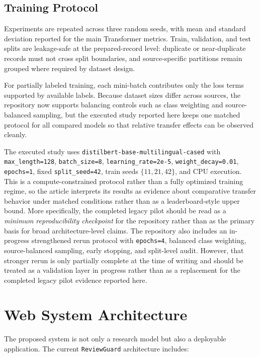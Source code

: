 \documentclass[12pt,a4paper]{article}
\begin{document}
\subsection{Training Protocol}

Experiments are repeated across three random seeds, with mean and standard deviation reported for the main Transformer metrics. Train, validation, and test splits are leakage-safe at the prepared-record level: duplicate or near-duplicate records must not cross split boundaries, and source-specific partitions remain grouped where required by dataset design.

For partially labeled training, each mini-batch contributes only the loss terms supported by available labels. Because dataset sizes differ across sources, the repository now supports balancing controls such as class weighting and source-balanced sampling, but the executed study reported here keeps one matched protocol for all compared models so that relative transfer effects can be observed cleanly.

The executed study uses \texttt{distilbert-base-multilingual-cased} with \texttt{max\_length=128}, \texttt{batch\_size=8}, \texttt{learning\_rate=2e-5}, \texttt{weight\_decay=0.01}, \texttt{epochs=1}, fixed \texttt{split\_seed=42}, train seeds $\{11, 21, 42\}$, and CPU execution. This is a compute-constrained protocol rather than a fully optimized training regime, so the article interprets its results as evidence about comparative transfer behavior under matched conditions rather than as a leaderboard-style upper bound. More specifically, the completed legacy pilot should be read as a \emph{minimum reproducibility checkpoint} for the repository rather than as the primary basis for broad architecture-level claims. The repository also includes an in-progress strengthened rerun protocol with \texttt{epochs=4}, balanced class weighting, source-balanced sampling, early stopping, and split-level audit. However, that stronger rerun is only partially complete at the time of writing and should be treated as a validation layer in progress rather than as a replacement for the completed legacy pilot evidence reported here.

\section{Web System Architecture}

The proposed system is not only a research model but also a deployable application. The current \texttt{ReviewGuard} architecture includes:
\end{document}
